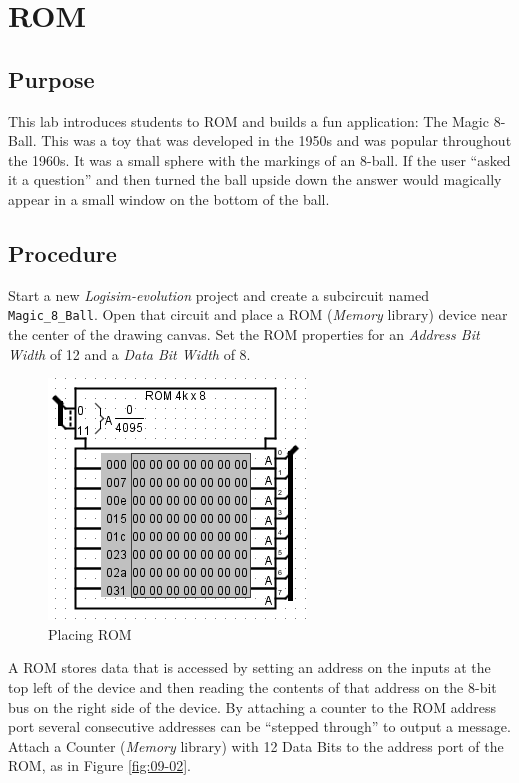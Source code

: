 \chapter{ROM}\label{Lab09}

\section{Purpose}

This lab introduces students to \acf{ROM} and builds a fun application: The Magic 8-Ball. This was a toy that was developed in the 1950s and was popular throughout the 1960s. It was a small sphere with the markings of an 8-ball. If the user ``asked it a question'' and then turned the ball upside down the answer would magically appear in a small window on the bottom of the ball.

\section{Procedure}

Start a new \textit{Logisim-evolution} project and create a subcircuit named \lstinline[columns=fixed]|Magic_8_Ball|. Open that circuit and place a ROM (\textit{Memory} library) device near the center of the drawing canvas. Set the ROM properties for an \textit{Address Bit Width} of 12 and a \textit{Data Bit Width} of 8.

\begin{figure}[H]
	\centering
	\includegraphics[width=\maxwidth{.95\linewidth}]{gfx/09-01}
	\caption{Placing ROM}
	\label{fig:09-01}
\end{figure}

A ROM stores data that is accessed by setting an address on the inputs at the top left of the device and then reading the contents of that address on the 8-bit bus on the right side of the device. By attaching a counter to the ROM address port several consecutive addresses can be ``stepped through'' to output a message. Attach a Counter (\textit{Memory} library) with 12 Data Bits to the address port of the ROM, as in Figure \ref{fig:09-02}.

